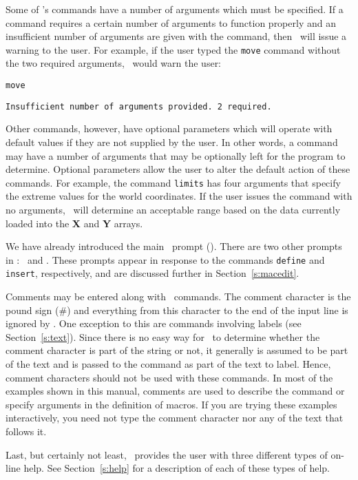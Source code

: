 Some of \wip's commands have a number of arguments which must be specified.
If a command requires a certain number of arguments to function properly
and an insufficient number of arguments are given with the command,
then \wip\ will issue a warning to the user.
For example, if the user typed the {\tt move} command without the two
required arguments, \wip\ would warn the user:
\begin{wiplist}%
  \item {\tt move}
\samepage
  \item [\ ] {\tt Insufficient number of arguments provided. 2 required.}
\end{wiplist}
Other commands, however, have optional parameters which will operate
with default values if they are not supplied by the user.
In other words, a command may have a number of arguments that may be
optionally left for the program to determine.
Optional parameters allow the user to alter the default action
of these commands.
For example, the command {\tt limits} has four arguments
that specify the extreme values for the
world coordinates.
If the user issues the command with no arguments,
\wip\ will determine an acceptable range based on the data currently
loaded into the {\bf X} and {\bf Y} arrays.

We have already introduced the main \wip\ prompt (\wipp).
There are two other prompts in \wip:  \wipd\ and \wipi.
These prompts appear in response to the commands
{\tt define}
and {\tt insert},
respectively, and are discussed further in Section~\ref{s:macedit}.

Comments
may be entered along with \wip\ commands.
The comment character is
the pound sign (\#)
and everything from this
character to the end of the input line is ignored by \wip.
One exception to this are commands involving labels (see Section~\ref{s:text}).
Since there is no easy way for \wip\ to determine whether the comment
character is part of the string or not,
it generally is assumed to be part of the text and is passed
to the command as part of the text to label.
Hence, comment characters should not be used with these commands.
In most of the examples shown in this manual, comments are used to
describe the command or specify arguments in the definition of macros.
If you are trying these examples interactively, you need not type the
comment character nor any of the text that follows it.

Last, but certainly not least, \wip\ provides the user with three
different types of on-line help.
See Section~\ref{s:help} for a description of each of these types of help.
